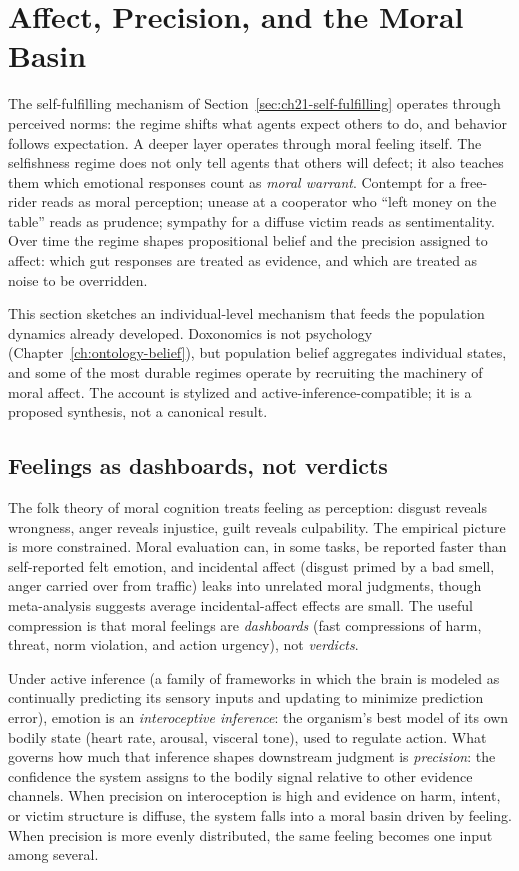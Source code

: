 \section{Affect, Precision, and the Moral Basin}
\label{sec:ch21-affect-precision}

The self-fulfilling mechanism of Section~\ref{sec:ch21-self-fulfilling} operates through perceived norms: the regime shifts what agents expect others to do, and behavior follows expectation.
A deeper layer operates through moral feeling itself.
The selfishness regime does not only tell agents that others will defect; it also teaches them which emotional responses count as \emph{moral warrant}.
Contempt for a free-rider reads as moral perception; unease at a cooperator who ``left money on the table'' reads as prudence; sympathy for a diffuse victim reads as sentimentality.
Over time the regime shapes propositional belief and the precision assigned to affect: which gut responses are treated as evidence, and which are treated as noise to be overridden.

This section sketches an individual-level mechanism that feeds the population dynamics already developed.
Doxonomics is not psychology (Chapter~\ref{ch:ontology-belief}), but population belief aggregates individual states, and some of the most durable regimes operate by recruiting the machinery of moral affect.
The account is stylized and active-inference-compatible; it is a proposed synthesis, not a canonical result.

\subsection{Feelings as dashboards, not verdicts}

The folk theory of moral cognition treats feeling as perception: disgust reveals wrongness, anger reveals injustice, guilt reveals culpability.
The empirical picture is more constrained.
Moral evaluation can, in some tasks, be reported faster than self-reported felt emotion, and incidental affect (disgust primed by a bad smell, anger carried over from traffic) leaks into unrelated moral judgments, though meta-analysis suggests average incidental-affect effects are small.
The useful compression is that moral feelings are \emph{dashboards} (fast compressions of harm, threat, norm violation, and action urgency), not \emph{verdicts}.

Under active inference (a family of frameworks in which the brain is modeled as continually predicting its sensory inputs and updating to minimize prediction error), emotion is an \emph{interoceptive inference}: the organism's best model of its own bodily state (heart rate, arousal, visceral tone), used to regulate action.
What governs how much that inference shapes downstream judgment is \emph{precision}: the confidence the system assigns to the bodily signal relative to other evidence channels.
When precision on interoception is high and evidence on harm, intent, or victim structure is diffuse, the system falls into a moral basin driven by feeling.
When precision is more evenly distributed, the same feeling becomes one input among several.


